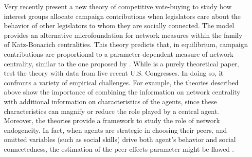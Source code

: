 \documentclass[nojss]{jss}
\begin{document}
	Very recently \cite{Battaglini+Patacchini:2018} present a new theory of competitive vote-buying to study how interest groups allocate campaign contributions when legislators care about the behavior of other legislators to whom they are socially connected. The model provides an alternative microfoundation for network measures within the family of Katz-Bonacich centralities. This theory predicts that, in equilibrium, campaign contributions are proportional to a parameter-dependent measure of network centrality, similar to the one proposed by \cite{Ballester+Armengol+Zenou:2006}. While \cite{Ballester+Armengol+Zenou:2006} is a purely theoretical paper, \cite{Battaglini+Patacchini:2018} test the theory with data from five recent U.S. Congresses. In doing so, it confronts a variety of empirical challenges. For example, the theories described above show the importance of combining the information on network centrality with additional information on characteristics of the agents, since these characteristics can magnify or reduce the role played by a central agent. Moreover, the theories provide a framework to study the role of network endogeneity. In fact, when agents are strategic in choosing their peers, and omitted variables (such as social skills) drive both agent's behavior and social connectedness, the estimation of the peer effects parameter might be flawed \citep{Manski:1993}.
	
\end{document}
